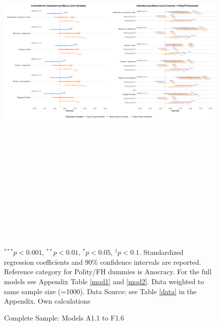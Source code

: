 \documentclass[]{article}
\begin{document}
\begin{landscape}
    \begin{figure}
        \caption{Complete Sample: Models A1.1 to F1.6}
        \label{reg1}
        \includegraphics[width=690pt,height=530pt]{images/coefplot.png}
        \flushright
        {\scriptsize $^{***}p<0.001$, $^{**}p<0.01$, $^*p<0.05$, $^{\dagger}p<0.1$. Standardized regression coefficients and 90\% confidence intervals are reported. Reference category for Polity/FH dummies is Anocracy. For the full models see Appendix Table \ref{mod1} and \ref{mod2}. Data weighted to same sample size (=1000). Data Source: see Table \ref{data} in the Appendix. Own calculations  \par}
    \end{figure}
\end{landscape}
\end{document}
